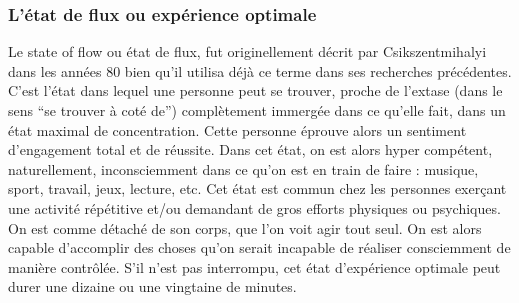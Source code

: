 	\subsubsection{L'état de flux ou expérience optimale}
Le state of flow ou état de flux, fut originellement décrit par Csikszentmihalyi\cite{Csik88} dans les années 80 bien qu'il utilisa déjà ce terme dans ses recherches précédentes\cite{Csik75}. C'est l'état dans lequel une personne peut se trouver, proche de l’extase (dans le sens “se trouver à coté de”) complètement immergée dans ce qu'elle fait, dans un état maximal de concentration. Cette personne éprouve alors un sentiment d'engagement total et de réussite. Dans cet état, on est alors hyper compétent, naturellement, inconsciemment dans ce qu’on est en train de faire : musique, sport, travail, jeux, lecture, etc. Cet état est commun chez les personnes exerçant une activité répétitive et/ou demandant de gros efforts physiques ou psychiques. On est comme détaché de son corps, que l’on voit agir tout seul. On est alors capable d’accomplir des choses qu’on serait incapable de réaliser consciemment de manière contrôlée. S’il n’est pas interrompu, cet état d'expérience optimale peut durer une dizaine ou une vingtaine de minutes.


